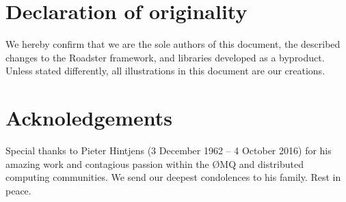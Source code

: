 \documentclass[a4paper]{report}
\newcommand\zmq{{\O}MQ\xspace}
\begin{document}
\begin{abstract}




\end{abstract}

\chapter*{Declaration of originality}
We hereby confirm that we are the sole authors of this document, the
described changes to the Roadster framework, and libraries developed as a
byproduct. Unless stated differently, all illustrations in this document are
our creations.

%

\chapter*{Acknoledgements}

Special thanks to Pieter Hintjens {\textdagger} (3 December 1962 -- 4 October
2016) for his amazing work and contagious passion within the \zmq and
distributed computing communities. We send our deepest condolences to his
family. Rest in peace.

\setcounter{tocdepth}{4}
\tableofcontents
\listoffigures
\listoftables
\listoflistings

\pagebreak
{}
\setcounter{page}{1}
\setcounter{secnumdepth}{3}



\end{document}
